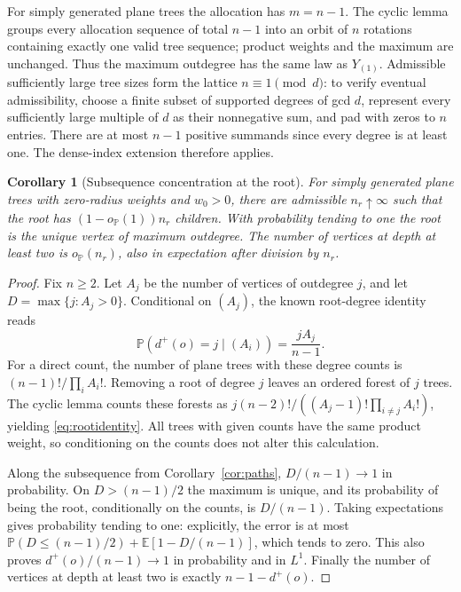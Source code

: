 \documentclass[11pt]{amsart}
\newtheorem{corollary}[theorem]{Corollary}
\theoremstyle{remark}\newtheorem{remark}[theorem]{Remark}
\newcommand{\Pp}{\mathbb P}
\newcommand{\E}{\mathbb E}
\begin{document}
For simply generated plane trees the allocation has $m=n-1$. The cyclic
lemma groups every allocation sequence of total $n-1$ into an orbit of
$n$ rotations containing exactly one valid tree sequence; product weights
and the maximum are unchanged. Thus the maximum outdegree has the same
law as $Y_{(1)}$. Admissible sufficiently large tree sizes form the lattice
$n\equiv1\pmod d$: to verify eventual admissibility, choose a finite subset
of supported degrees of gcd $d$, represent every sufficiently large
multiple of $d$ as their nonnegative sum, and pad with zeros to $n$ entries.
There are at most $n-1$ positive summands since every degree is at least one.
The dense-index extension therefore applies.

\begin{corollary}[Subsequence concentration at the root]\label{cor:root}
For simply generated plane trees with zero-radius weights and $w_0>0$,
there are admissible $n_r\uparrow\infty$ such that the root has
$(1-o_{\Pp}(1))n_r$ children. With probability tending to one the root is
the unique vertex of maximum outdegree. The number of vertices at depth
at least two is $o_{\Pp}(n_r)$, also in expectation after division by $n_r$.
\end{corollary}

\begin{proof}
Fix $n\ge2$. Let $A_j$ be the number of vertices of outdegree $j$, and let
$D=\max\{j:A_j>0\}$. Conditional on $(A_j)$, the known root-degree identity
\cite[Lemma~14.7]{JansonPreprint} reads
\begin{equation}\label{eq:rootidentity}
 \Pp(d^+(o)=j\mid(A_i))=\frac{jA_j}{n-1}.
\end{equation}
For a direct count, the number of plane trees with these degree counts is
$(n-1)!/\prod_iA_i!$. Removing a root of degree $j$ leaves an ordered forest
of $j$ trees. The cyclic lemma counts these forests as
$j(n-2)!/((A_j-1)!\prod_{i\ne j}A_i!)$, yielding
\eqref{eq:rootidentity}. All trees with given counts have the same product
weight, so conditioning on the counts does not alter this calculation.

Along the subsequence from Corollary~\ref{cor:paths}, $D/(n-1)\to1$ in
probability. On $D>(n-1)/2$ the maximum is unique, and its probability of
being the root, conditionally on the counts, is $D/(n-1)$. Taking
expectations gives probability tending to one: explicitly, the error is
at most
$\Pp(D\le(n-1)/2)+\E[1-D/(n-1)]$, which tends to zero. This also proves
$d^+(o)/(n-1)\to1$ in probability and in $L^1$. Finally the number of
vertices at depth at least two is exactly $n-1-d^+(o)$.
\end{proof}
\end{document}
